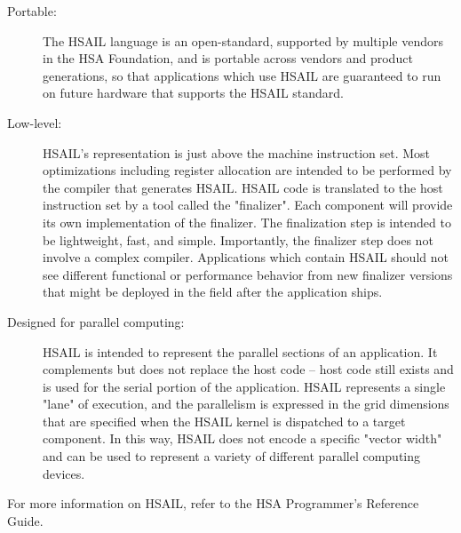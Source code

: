 \documentclass[draft]{book}
\begin{document}
\begin{description}
\item[Portable:] The HSAIL language is an open-standard, supported by multiple
  vendors in the HSA Foundation, and is portable across vendors and product
  generations, so that applications which use HSAIL are guaranteed to run on
  future hardware that supports the HSAIL standard.
\item[Low-level:] HSAIL's representation is just above the machine instruction
  set. Most optimizations including register allocation are intended to be
  performed by the compiler that generates HSAIL. HSAIL code is translated to
  the host instruction set by a tool called the "finalizer". Each component
  will provide its own implementation of the finalizer. The finalization step
  is intended to be lightweight, fast, and simple. Importantly, the finalizer
  step does not involve a complex compiler. Applications which contain HSAIL
  should not see different functional or performance behavior from new finalizer
  versions that might be deployed in the field after the application ships.
\item[Designed for parallel computing:] HSAIL is intended to represent the
  parallel sections of an application. It complements but does not replace the
  host code – host code still exists and is used for the serial portion of the
  application. HSAIL represents a single "lane" of execution, and the
  parallelism is expressed in the grid dimensions that are specified when the
  HSAIL kernel is dispatched to a target component. In this way, HSAIL does not
  encode a specific "vector width" and can be used to represent a variety of
  different parallel computing devices.
\end{description}

For more information on HSAIL, refer to the HSA Programmer's Reference Guide.
\end{document}
